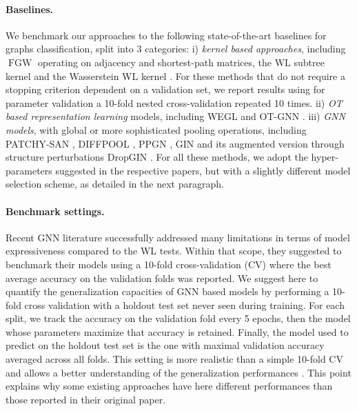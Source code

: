 \documentclass{article}
\newcommand{\FGW}{\operatorname{FGW}}
\begin{document}
\paragraph{Baselines.} We benchmark our approaches to the following
state-of-the-art baselines for graphs classification, split into 3 categories:
i) \emph{kernel based approaches}, including $\FGW$ \cite{titouan2019optimal} operating on
adjacency and shortest-path matrices, the WL subtree kernel
\cite[WL]{shervashidze2011weisfeiler} and the Wasserstein WL kernel
\cite[WWL]{Togninalli19}. For these methods that do not require a stopping criterion
dependent on a validation set, we report results using for parameter validation a 10-fold nested cross-validation
\cite{titouan2019optimal,kriege2020survey} repeated 10 times. 
ii) \emph{OT based representation learning} models, including WEGL
\cite{kolouri2020wasserstein} and OT-GNN \cite{chen2020optimal}. iii) \emph{GNN models},
with global or more sophisticated pooling operations, including PATCHY-SAN
\cite{niepert2016learning}, DIFFPOOL \cite{ying2018hierarchical}, PPGN
\cite{maron2019provably}, GIN \cite{xu2018powerful} and its augmented version
through structure perturbations DropGIN \cite{papp2021dropgnn}.
For all these methods, we adopt the hyper-parameters suggested in the respective  papers, but with a slightly different model selection scheme, as detailed in the next paragraph.



\paragraph{Benchmark settings.} Recent GNN literature \cite{maron2018invariant,
xu2018powerful,maron2019provably,papp2021dropgnn} successfully addressed many
limitations in terms of model expressiveness compared to the WL tests.
Within that scope, they suggested to benchmark their models using a 10-fold
cross-validation (CV) where the best average accuracy on the validation folds was
reported. We suggest here to quantify the generalization capacities of GNN based
models by performing a 10-fold cross validation with a holdout test set never
seen during training. For each split, we track the accuracy on the validation
fold every 5 epochs, then the model whose parameters maximize that
accuracy is retained. Finally, the model used to predict on the holdout test set is the one with maximal validation accuracy averaged across all 
folds. This setting is more realistic than a simple 10-fold
CV and allows a better understanding of the generalization performances \cite{bengio2003no}. This point explains why some existing approaches have here different performances than those reported in their original paper.
\end{document}
